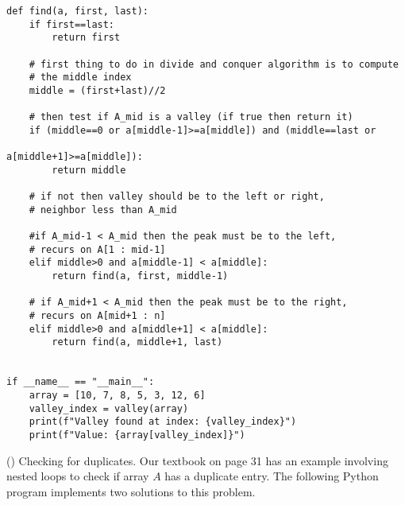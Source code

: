 \documentclass[addpoints,11pt]{exam}
\begin{document}
\begin{questions}
\begin{solutionorbox}
\begin{verbatim}
def find(a, first, last):
    if first==last:
        return first
    
    # first thing to do in divide and conquer algorithm is to compute
    # the middle index
    middle = (first+last)//2

    # then test if A_mid is a valley (if true then return it)
    if (middle==0 or a[middle-1]>=a[middle]) and (middle==last or 
                                                  a[middle+1]>=a[middle]):
        return middle
    
    # if not then valley should be to the left or right,
    # neighbor less than A_mid

    #if A_mid-1 < A_mid then the peak must be to the left,
    # recurs on A[1 : mid-1]
    elif middle>0 and a[middle-1] < a[middle]:
        return find(a, first, middle-1)

    # if A_mid+1 < A_mid then the peak must be to the right,
    # recurs on A[mid+1 : n]
    elif middle>0 and a[middle+1] < a[middle]:
        return find(a, middle+1, last)


if __name__ == "__main__":
    array = [10, 7, 8, 5, 3, 12, 6]
    valley_index = valley(array)
    print(f"Valley found at index: {valley_index}")
    print(f"Value: {array[valley_index]}")
\end{verbatim}
\end{solutionorbox}

\newpage


\question(\totalpoints {})
Checking for duplicates.  Our textbook on page 31 has an example involving nested loops to check if array $A$ has a duplicate entry.  The following Python program implements two solutions to this problem.  
\end{questions}
\end{document}

